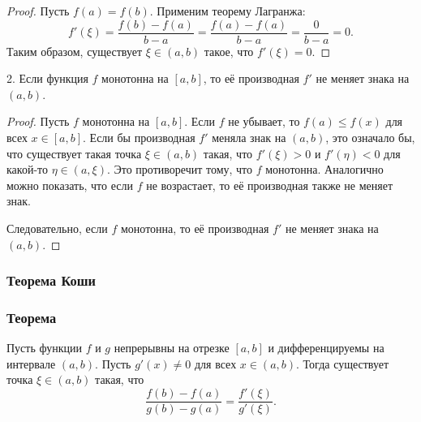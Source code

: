     \begin{proof}
    Пусть \( f(a) = f(b) \). Применим теорему Лагранжа: 
    \[
    f'(\xi) = \frac{f(b) - f(a)}{b - a} = \frac{f(a) - f(a)}{b - a} = \frac{0}{b - a} = 0.
    \]
    Таким образом, существует \( \xi \in (a,b) \) такое, что \( f'(\xi) = 0 \).
    \end{proof}
    
    2. Если функция \( f \) монотонна на \( [a, b] \), то её производная \( f' \) не меняет знака на \( (a,b) \).
    
    \begin{proof}
    Пусть \( f \) монотонна на \( [a, b] \). Если \( f \) не убывает, то \( f(a) \leq f(x) \) для всех \( x \in [a, b] \). Если бы производная \( f' \) меняла знак на \( (a,b) \), это означало бы, что существует такая точка \( \xi \in (a,b) \) такая, что \( f'(\xi) > 0 \) и \( f'(\eta) < 0 \) для какой-то \( \eta \in (a, \xi) \). Это противоречит тому, что \( f \) монотонна. Аналогично можно показать, что если \( f \) не возрастает, то её производная также не меняет знак. 
    
    Следовательно, если \( f \) монотонна, то её производная \( f' \) не меняет знака на \( (a,b) \).
    \end{proof}


    \subsubsection{Теорема Коши}

    \subsubsection*{Теорема}
    Пусть функции \( f \) и \( g \) непрерывны на отрезке \( [a, b] \) и дифференцируемы на интервале \( (a, b) \). Пусть \( g'(x) \neq 0 \) для всех \( x \in (a, b) \). Тогда существует точка \( \xi \in (a, b) \) такая, что
    \[
    \frac{f(b) - f(a)}{g(b) - g(a)} = \frac{f'(\xi)}{g'(\xi)}.
    \]
    

